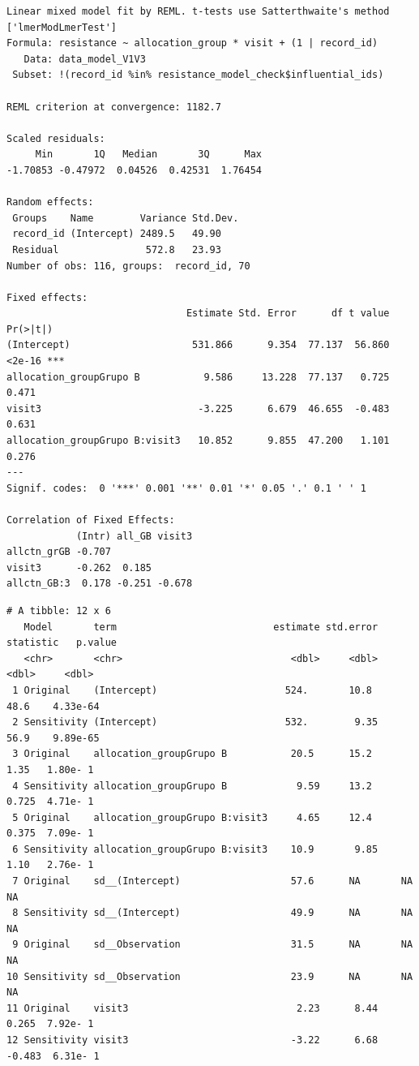 \documentclass[
  12pt,
]{article}
\newenvironment{Shaded}{\begin{snugshade}}{\end{snugshade}}
\newcommand{\NormalTok}[1]{\textcolor[rgb]{0.00,0.23,0.31}{#1}}
\newcommand{\SpecialCharTok}[1]{\textcolor[rgb]{0.37,0.37,0.37}{#1}}
\begin{document}
\begin{verbatim}
Linear mixed model fit by REML. t-tests use Satterthwaite's method ['lmerModLmerTest']
Formula: resistance ~ allocation_group * visit + (1 | record_id)
   Data: data_model_V1V3
 Subset: !(record_id %in% resistance_model_check$influential_ids)

REML criterion at convergence: 1182.7

Scaled residuals: 
     Min       1Q   Median       3Q      Max 
-1.70853 -0.47972  0.04526  0.42531  1.76454 

Random effects:
 Groups    Name        Variance Std.Dev.
 record_id (Intercept) 2489.5   49.90   
 Residual               572.8   23.93   
Number of obs: 116, groups:  record_id, 70

Fixed effects:
                               Estimate Std. Error      df t value Pr(>|t|)    
(Intercept)                     531.866      9.354  77.137  56.860   <2e-16 ***
allocation_groupGrupo B           9.586     13.228  77.137   0.725    0.471    
visit3                           -3.225      6.679  46.655  -0.483    0.631    
allocation_groupGrupo B:visit3   10.852      9.855  47.200   1.101    0.276    
---
Signif. codes:  0 '***' 0.001 '**' 0.01 '*' 0.05 '.' 0.1 ' ' 1

Correlation of Fixed Effects:
            (Intr) all_GB visit3
allctn_grGB -0.707              
visit3      -0.262  0.185       
allctn_GB:3  0.178 -0.251 -0.678
\end{verbatim}

\begin{Shaded}
\end{Shaded}

\begin{verbatim}
# A tibble: 12 x 6
   Model       term                           estimate std.error statistic   p.value
   <chr>       <chr>                             <dbl>     <dbl>     <dbl>     <dbl>
 1 Original    (Intercept)                      524.       10.8     48.6    4.33e-64
 2 Sensitivity (Intercept)                      532.        9.35    56.9    9.89e-65
 3 Original    allocation_groupGrupo B           20.5      15.2      1.35   1.80e- 1
 4 Sensitivity allocation_groupGrupo B            9.59     13.2      0.725  4.71e- 1
 5 Original    allocation_groupGrupo B:visit3     4.65     12.4      0.375  7.09e- 1
 6 Sensitivity allocation_groupGrupo B:visit3    10.9       9.85     1.10   2.76e- 1
 7 Original    sd__(Intercept)                   57.6      NA       NA     NA       
 8 Sensitivity sd__(Intercept)                   49.9      NA       NA     NA       
 9 Original    sd__Observation                   31.5      NA       NA     NA       
10 Sensitivity sd__Observation                   23.9      NA       NA     NA       
11 Original    visit3                             2.23      8.44     0.265  7.92e- 1
12 Sensitivity visit3                            -3.22      6.68    -0.483  6.31e- 1
\end{verbatim}
\end{document}
